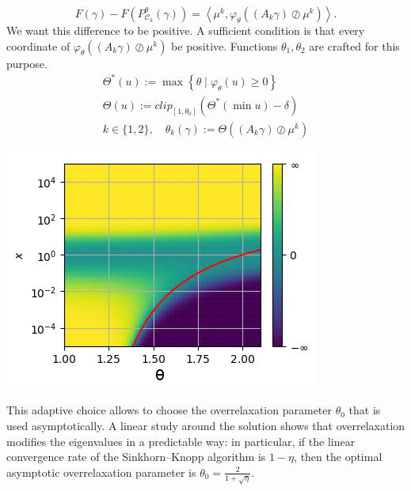 \documentclass[landscape,a0paper,fontscale=0.35]{baposter} %
\theoremstyle{plain}
\theoremstyle{plain}
\theoremstyle{plain}
\theoremstyle{plain}
\newcommand{\scal}[2]{\left\langle #1 , #2 \right\rangle}
\DeclareMathOperator{\Ccal}{\mathcal{C}}
\begin{document}
\begin{poster}
{    \begin{minipage}{0.65\textwidth}
    	\begin{equation*} \label{eq:kl_diff_scal}
    	F(\gamma) - F(P^\theta_{\Ccal_k}(\gamma)) = 
    	\scal{\mu^k}{\varphi_\theta \left((A_k \gamma) \oslash \mu^k \right)}.
    	\end{equation*}
    	We want this difference to be positive. A sufficient condition is that every coordinate of $\varphi_\theta \left((A_k \gamma) \oslash \mu^k \right)$ be positive. Functions $\theta_1, \theta_2$ are crafted for this purpose.
    	\begin{gather*}
    	\Theta^*(u) := \max \left\{\theta \mid \varphi_\theta(u) \ge 0 \right\}
    	\\
    	\Theta(u) := clip_{[1,\theta_0]}(\Theta^*(\min u)-\delta)\\
    	k \in \{1,2\}, \quad \theta_k (\gamma) := \Theta((A_k \gamma) \oslash \mu^k)
    	\end{gather*}
    \end{minipage}
	\begin{minipage}{0.34\textwidth}
		\begin{tcolorbox}[size=small]
			\centering
			\includegraphics[width=\textwidth]{images/cvgce_zone_2.png}
		\end{tcolorbox}
	\end{minipage}
This adaptive choice allows to choose the overrelaxation parameter $\theta_0$ that is used asymptotically. A linear study around the solution shows that overrelaxation modifies the eigenvalues in a predictable way: in particular, if the linear convergence rate of the Sinkhorn--Knopp algorithm is $1-\eta$, then the optimal asymptotic overrelaxation parameter is $\theta_0 = \frac{2}{1+\sqrt{\eta}}$.
}




\end{poster}
\end{document}
